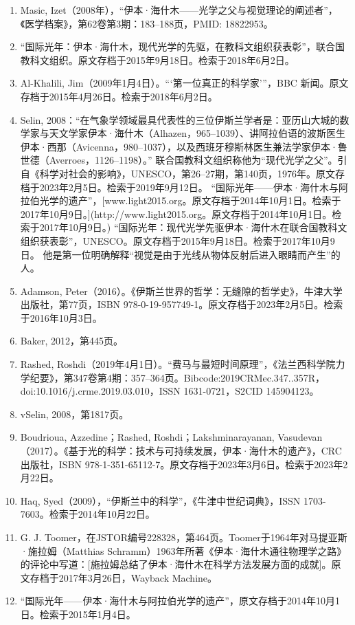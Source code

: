 \begin{enumerate}
\item Masic, Izet（2008年），“伊本·海什木——光学之父与视觉理论的阐述者”，《医学档案》，第62卷第3期：183–188页，PMID: 18822953。
\item “国际光年：伊本·海什木，现代光学的先驱，在教科文组织获表彰”，联合国教科文组织。原文存档于2015年9月18日。检索于2018年6月2日。
\item Al-Khalili, Jim（2009年1月4日）。“‘第一位真正的科学家’”，BBC 新闻。原文存档于2015年4月26日。检索于2018年6月2日。
\item Selin, 2008：“在气象学领域最具代表性的三位伊斯兰学者是：亚历山大城的数学家与天文学家伊本·海什木（Alhazen，965–1039）、讲阿拉伯语的波斯医生伊本·西那（Avicenna，980–1037），以及西班牙穆斯林医生兼法学家伊本·鲁世德（Averroes，1126–1198）。”
联合国教科文组织称他为“现代光学之父”。引自《科学对社会的影响》，UNESCO，第26–27期，第140页，1976年。原文存档于2023年2月5日。检索于2019年9月12日。
“国际光年——伊本·海什木与阿拉伯光学的遗产”，[www.light2015.org。原文存档于2014年10月1日。检索于2017年10月9日。](http://www.light2015.org。原文存档于2014年10月1日。检索于2017年10月9日。)
“国际光年：现代光学先驱伊本·海什木在联合国教科文组织获表彰”，UNESCO。原文存档于2015年9月18日。检索于2017年10月9日。
他是第一位明确解释“视觉是由于光线从物体反射后进入眼睛而产生”的人。
\item Adamson, Peter（2016）。《伊斯兰世界的哲学：无缝隙的哲学史》，牛津大学出版社，第77页，ISBN 978-0-19-957749-1。原文存档于2023年2月5日。检索于2016年10月3日。
\item Baker, 2012，第445页。
\item Rashed, Roshdi（2019年4月1日）。“费马与最短时间原理”，《法兰西科学院力学纪要》，第347卷第4期：357–364页。Bibcode:2019CRMec.347..357R，doi:10.1016/j.crme.2019.03.010，ISSN 1631-0721，S2CID 145904123。
\item vSelin, 2008，第1817页。
\item Boudrioua, Azzedine；Rashed, Roshdi；Lakshminarayanan, Vasudevan（2017）。《基于光的科学：技术与可持续发展，伊本·海什木的遗产》，CRC出版社，ISBN 978-1-351-65112-7。原文存档于2023年3月6日。检索于2023年2月22日。
\item Haq, Syed（2009），“伊斯兰中的科学”，《牛津中世纪词典》，ISSN 1703-7603。检索于2014年10月22日。
\item G. J. Toomer，在JSTOR编号228328，第464页。Toomer于1964年对马提亚斯·施拉姆（Matthias Schramm）1963年所著《伊本·海什木通往物理学之路》的评论中写道：[施拉姆总结了伊本·海什木在科学方法发展方面的成就]。原文存档于2017年3月26日，Wayback Machine。
\item “国际光年——伊本·海什木与阿拉伯光学的遗产”，原文存档于2014年10月1日。检索于2015年1月4日。

\end{enumerate}
